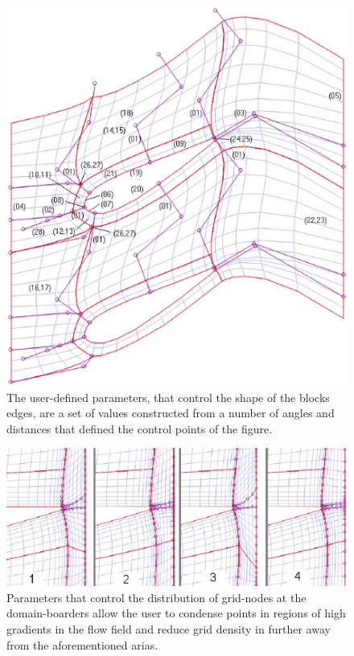 \begin{figure}[h!]
\centering
\includegraphics[width=120mm]{cGridSkParam.eps} 
\caption{The user-defined parameters, that control the shape of the blocks edges, are a set of values constructed from a number of angles and distances that defined the control points of the figure.}
\label{grid2}
\end{figure}

\begin{figure}[h!]
\centering
\includegraphics[width=120mm]{sketchDistrEast.eps} 
\caption{Parameters that control the distribution of grid-nodes at the domain-boarders allow the user to condense points in regions of high gradients in the flow field and reduce grid density in further away from the aforementioned arias.}
\label{grid3}
\end{figure}

